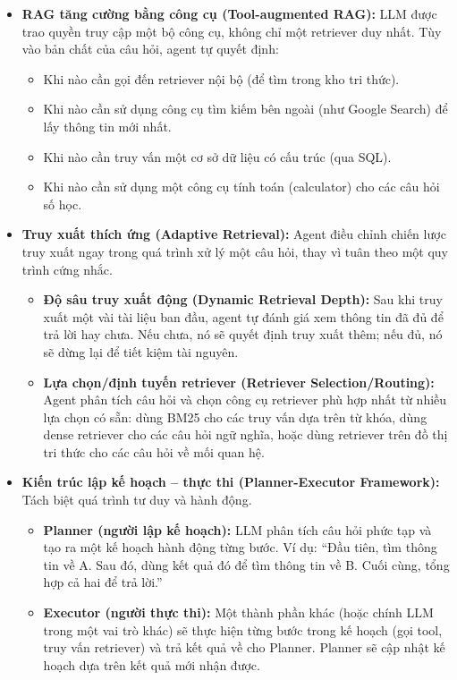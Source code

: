\begin{itemize}
	\item \textbf{RAG tăng cường bằng công cụ (Tool-augmented RAG):}
	LLM được trao quyền truy cập một bộ công cụ, không chỉ một retriever duy nhất. Tùy vào bản chất của câu hỏi, agent tự quyết định:
	\begin{itemize}
		\item Khi nào cần gọi đến retriever nội bộ (để tìm trong kho tri thức).
		\item Khi nào cần sử dụng công cụ tìm kiếm bên ngoài (như Google Search) để lấy thông tin mới nhất.
		\item Khi nào cần truy vấn một cơ sở dữ liệu có cấu trúc (qua SQL).
		\item Khi nào cần sử dụng một công cụ tính toán (calculator) cho các câu hỏi số học.
	\end{itemize}
	
	\item \textbf{Truy xuất thích ứng (Adaptive Retrieval):}
	Agent điều chỉnh chiến lược truy xuất ngay trong quá trình xử lý một câu hỏi, thay vì tuân theo một quy trình cứng nhắc.
	\begin{itemize}
		\item \textbf{Độ sâu truy xuất động (Dynamic Retrieval Depth):}
		Sau khi truy xuất một vài tài liệu ban đầu, agent tự đánh giá xem thông tin đã đủ để trả lời hay chưa. Nếu chưa, nó sẽ quyết định truy xuất thêm; nếu đủ, nó sẽ dừng lại để tiết kiệm tài nguyên.
		\item \textbf{Lựa chọn/định tuyến retriever (Retriever Selection/Routing):}
		Agent phân tích câu hỏi và chọn công cụ retriever phù hợp nhất từ nhiều lựa chọn có sẵn: dùng BM25 cho các truy vấn dựa trên từ khóa, dùng dense retriever cho các câu hỏi ngữ nghĩa, hoặc dùng retriever trên đồ thị tri thức cho các câu hỏi về mối quan hệ.
	\end{itemize}
	
	\item \textbf{Kiến trúc lập kế hoạch -- thực thi (Planner-Executor Framework):}
	Tách biệt quá trình tư duy và hành động.
	\begin{itemize}
		\item \textbf{Planner (người lập kế hoạch):}
		LLM phân tích câu hỏi phức tạp và tạo ra một kế hoạch hành động từng bước. Ví dụ: “Đầu tiên, tìm thông tin về A. Sau đó, dùng kết quả đó để tìm thông tin về B. Cuối cùng, tổng hợp cả hai để trả lời.”
		\item \textbf{Executor (người thực thi):}
		Một thành phần khác (hoặc chính LLM trong một vai trò khác) sẽ thực hiện từng bước trong kế hoạch (gọi tool, truy vấn retriever) và trả kết quả về cho Planner. Planner sẽ cập nhật kế hoạch dựa trên kết quả mới nhận được.
	\end{itemize}
	

\end{itemize}

